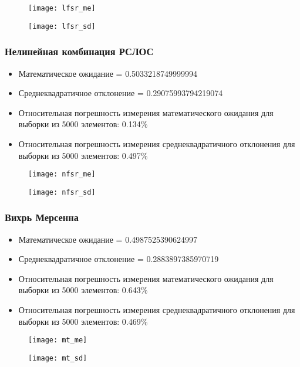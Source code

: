 \documentclass[spec, och, labwork]{SCWorks}
\begin{document}
\begin{figure}[H]
  \centering
  \texttt{[image: lfsr\_me]}
\end{figure}
\begin{figure}[H]
  \centering
  \texttt{[image: lfsr\_sd]}
\end{figure}

\subsubsection{Нелинейная комбинация РСЛОС}

\begin{itemize}
  \item Математическое ожидание = 0.5033218749999994
  \item Среднеквадратичное отклонение = 0.29075993794219074
  \item Относительная погрешность измерения математического ожидания для выборки из 5000 элементов: 0.134\%
  \item Относительная погрешность измерения среднеквадратичного отклонения для выборки из 5000 элементов: 0.497\%
\end{itemize}

\begin{figure}[H]
  \centering
  \texttt{[image: nfsr\_me]}
\end{figure}
\begin{figure}[H]
  \centering
  \texttt{[image: nfsr\_sd]}
\end{figure}

\subsubsection{Вихрь Мерсенна}

\begin{itemize}
  \item Математическое ожидание = 0.4987525390624997
  \item Среднеквадратичное отклонение = 0.2883897385970719
  \item Относительная погрешность измерения математического ожидания для выборки из 5000 элементов: 0.643\%
  \item Относительная погрешность измерения среднеквадратичного отклонения для выборки из 5000 элементов: 0.469\%
\end{itemize}

\begin{figure}[H]
  \centering
  \texttt{[image: mt\_me]}
\end{figure}
\begin{figure}[H]
  \centering
  \texttt{[image: mt\_sd]}
\end{figure}
\end{document}
